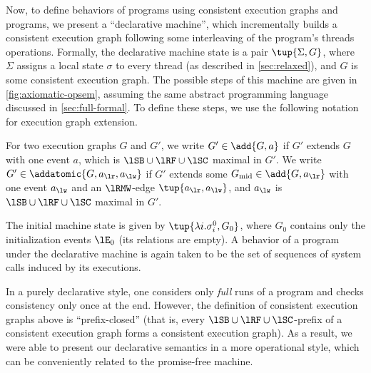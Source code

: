 Now, to define behaviors of programs using consistent 
execution graphs and programs, we present a ``declarative machine'', 
which incrementally builds a consistent execution graph
following some interleaving of the program's threads operations.
Formally, the declarative machine state is a pair $\tup{\Sigma,G}$, 
where $\Sigma$ assigns a local state $\sigma$ to every thread
(as described in \cref{sec:relaxed}), and $G$ is some consistent execution graph.
The possible steps of this machine are given in \cref{fig:axiomatic-opsem},
assuming the same abstract programming language discussed  in \cref{sec:full-formal}.
To define these steps, we use the following notation for execution graph extension.

\begin{notation}
For two execution graphs $G$ and $G'$,
we write $G'\in\add{G,a}$
if $G'$ extends $G$ with one event $a$,
which is $\lSB\cup\lRF\cup\lSC$ maximal in $G'$.
We write $G'\in\addatomic{G,a_\lr,a_\lw}$
if $G'$ extends some $G_{\text{mid}}\in \add{G,a_\lr}$ with 
one event $a_\lw$ and an $\lRMW$-edge $\tup{a_\lr,a_\lw}$,
and $a_\lw$ is $\lSB\cup\lRF\cup\lSC$ maximal in $G'$.
\end{notation}

The initial machine state is given by $\tup{\lambda i.\sigma_i^0, G_0}$,
where $G_0$ contains only the initialization events $\lE_0$ (its relations are empty).
A behavior of a program under the declarative machine 
is again taken to be the set of sequences of system calls induced by its executions.

\begin{remark}
In a purely declarative style, one considers only \emph{full} runs of a program and checks consistency only once at the end.
However, the definition of consistent execution graphs above is ``prefix-closed''
(that is, every $\lSB\cup\lRF\cup\lSC$-prefix of a consistent execution graph forms a consistent execution graph).  As a result, we were able to present our declarative
semantics in a more operational style,
which can be conveniently related to the promise-free machine.
\end{remark}

